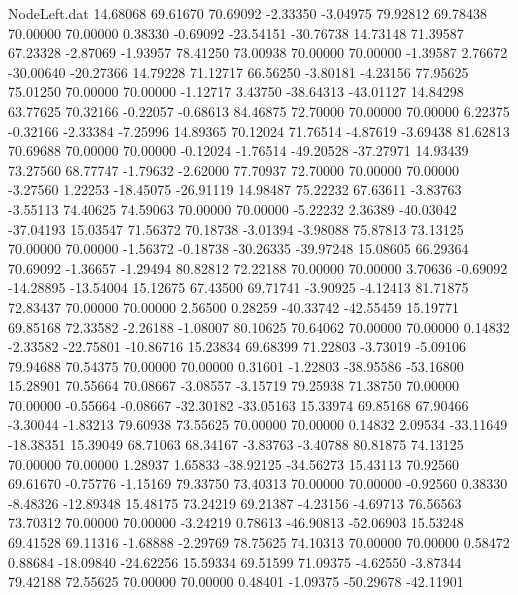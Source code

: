 \begin{filecontents}{NodeLeft.dat}
  14.68068   69.61670   70.69092    -2.33350   -3.04975   79.92812   69.78438   70.00000   70.00000    0.38330   -0.69092  -23.54151  -30.76738
  14.73148   71.39587   67.23328    -2.87069   -1.93957   78.41250   73.00938   70.00000   70.00000   -1.39587    2.76672  -30.00640  -20.27366
  14.79228   71.12717   66.56250    -3.80181   -4.23156   77.95625   75.01250   70.00000   70.00000   -1.12717    3.43750  -38.64313  -43.01127
  14.84298   63.77625   70.32166    -0.22057   -0.68613   84.46875   72.70000   70.00000   70.00000    6.22375   -0.32166   -2.33384   -7.25996
  14.89365   70.12024   71.76514    -4.87619   -3.69438   81.62813   70.69688   70.00000   70.00000   -0.12024   -1.76514  -49.20528  -37.27971
  14.93439   73.27560   68.77747    -1.79632   -2.62000   77.70937   72.70000   70.00000   70.00000   -3.27560    1.22253  -18.45075  -26.91119
  14.98487   75.22232   67.63611    -3.83763   -3.55113   74.40625   74.59063   70.00000   70.00000   -5.22232    2.36389  -40.03042  -37.04193
  15.03547   71.56372   70.18738    -3.01394   -3.98088   75.87813   73.13125   70.00000   70.00000   -1.56372   -0.18738  -30.26335  -39.97248
  15.08605   66.29364   70.69092    -1.36657   -1.29494   80.82812   72.22188   70.00000   70.00000    3.70636   -0.69092  -14.28895  -13.54004
  15.12675   67.43500   69.71741    -3.90925   -4.12413   81.71875   72.83437   70.00000   70.00000    2.56500    0.28259  -40.33742  -42.55459
  15.19771   69.85168   72.33582    -2.26188   -1.08007   80.10625   70.64062   70.00000   70.00000    0.14832   -2.33582  -22.75801  -10.86716
  15.23834   69.68399   71.22803    -3.73019   -5.09106   79.94688   70.54375   70.00000   70.00000    0.31601   -1.22803  -38.95586  -53.16800
  15.28901   70.55664   70.08667    -3.08557   -3.15719   79.25938   71.38750   70.00000   70.00000   -0.55664   -0.08667  -32.30182  -33.05163
  15.33974   69.85168   67.90466    -3.30044   -1.83213   79.60938   73.55625   70.00000   70.00000    0.14832    2.09534  -33.11649  -18.38351
  15.39049   68.71063   68.34167    -3.83763   -3.40788   80.81875   74.13125   70.00000   70.00000    1.28937    1.65833  -38.92125  -34.56273
  15.43113   70.92560   69.61670    -0.75776   -1.15169   79.33750   73.40313   70.00000   70.00000   -0.92560    0.38330   -8.48326  -12.89348
  15.48175   73.24219   69.21387    -4.23156   -4.69713   76.56563   73.70312   70.00000   70.00000   -3.24219    0.78613  -46.90813  -52.06903
  15.53248   69.41528   69.11316    -1.68888   -2.29769   78.75625   74.10313   70.00000   70.00000    0.58472    0.88684  -18.09840  -24.62256
  15.59334   69.51599   71.09375    -4.62550   -3.87344   79.42188   72.55625   70.00000   70.00000    0.48401   -1.09375  -50.29678  -42.11901

\end{filecontents}
